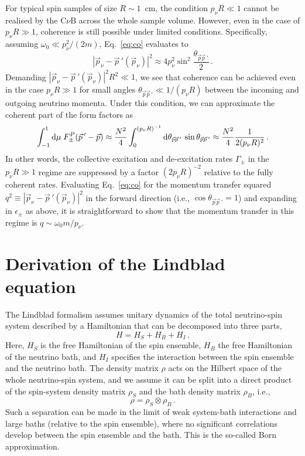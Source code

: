 \documentclass[aps,prd,10pt,twocolumn,superscriptaddress,floatfix,nofootinbib,amsmath,amssymb,altaffilletter,preprintnumbers]{revtex4-1}
\begin{document}
For typical spin samples of size $R \sim 1$~cm, the condition $p_\nu R \ll 1$ cannot be realised by the C$\nu$B across the whole sample volume. However, even in the case of $p_\nu R \gg1$, coherence is still possible under limited conditions.  Specifically, assuming $\omega_0\ll p_\nu^2/(2m)$, Eq.~\eqref{eq:co} evaluates to 
\begin{equation}
    |\vec{p}_\nu-\vec{p}\,'(\vec{p}_\nu)|^2\approx4p_\nu^2\sin^2{\frac{\theta_{\vec{p}\vec{p}\,'}}{2}}\,.
\end{equation}
Demanding $|\vec{p}_\nu-\vec{p}\,'(\vec{p}_\nu)|^2R^2 \ll 1$, we see that 
 coherence can be achieved even in the case $p_\nu R \gg 1$ for small angles $\theta_{\vec{p}\vec{p}\,'}\ll1/(p_\nu R)$ between the incoming and outgoing neutrino momenta. Under this condition, we can approximate the coherent part of the form factors as
\begin{equation}
\int_{-1}^1 {\rm d} \mu\; F_\pm^P(\vec{p}\,'-\vec{p}) \approx \frac{N^2}{4} \int_0^{(p_\nu R)^{-1}} {\rm d} \theta_{\vec{p}\vec{p}\,'}\, \sin\theta_{\vec{p}\vec{p}\,'} \approx \frac{N^2}{4} \frac{1}{2(p_\nu R)^{2}} \, .
\end{equation}
In other words, the collective excitation and de-excitation rates $\Gamma_\pm$ in the $p_\nu R \gg 1$ regime are suppressed by a factor $(2 p_\nu R)^{-2}$ relative to the fully coherent rates.  Evaluating Eq.~\eqref{eq:co} for the momentum transfer squared $q^2 \equiv|\vec{p}_\nu-\vec{p}\,'(\vec{p}_\nu)|^2$ in the forward direction (i.e., $\cos{\theta_{\vec{p}\vec{p}\,'}} = 1$) and expanding in $\epsilon_\pm$ as above, it is straightforward to show that the momentum transfer in this regime is $q \sim \omega_0 m/p_\nu$. 




\section{Derivation of the Lindblad equation}\label{app:derlindblad}


The Lindblad formalism assumes unitary dynamics of the total neutrino-spin system described by a Hamiltonian that can be decomposed into three parts,
\begin{equation}
    H=H_S+H_B+H_I\, .
\end{equation}
Here, $H_S$ is the free Hamiltonian of the spin ensemble, $H_B$ the free Hamiltonian of the neutrino bath, and $H_I$ specifies the interaction between the spin ensemble and the neutrino bath. The density matrix $\rho$ acts on the Hilbert space of the whole neutrino-spin system, and we assume it can be split into a direct product of the spin-system density matrix $\rho_S$ and the bath density matrix $\rho_B$, i.e.,
\begin{equation}
    \rho=\rho_S\otimes\rho_B\, .
\end{equation}
Such a separation can be made in the limit of weak system-bath interactions and large baths (relative to the spin ensemble), where no significant correlations develop between the spin ensemble and the bath. This is the so-called Born approximation.
\end{document}
